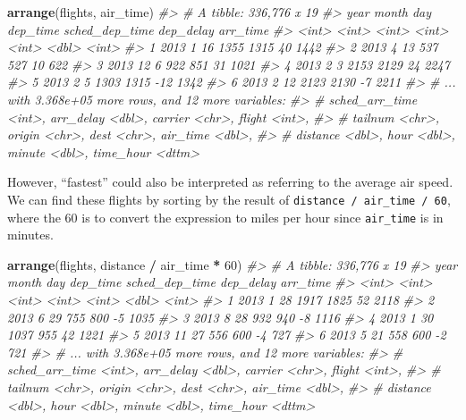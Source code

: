 \documentclass[]{book}
\newenvironment{Shaded}{\begin{snugshade}}{\end{snugshade}}
\newcommand{\CommentTok}[1]{\textcolor[rgb]{0.56,0.35,0.01}{\textit{#1}}}
\newcommand{\DecValTok}[1]{\textcolor[rgb]{0.00,0.00,0.81}{#1}}
\newcommand{\KeywordTok}[1]{\textcolor[rgb]{0.13,0.29,0.53}{\textbf{#1}}}
\newcommand{\NormalTok}[1]{#1}
\newcommand{\OperatorTok}[1]{\textcolor[rgb]{0.81,0.36,0.00}{\textbf{#1}}}
\newcommand{\StringTok}[1]{\textcolor[rgb]{0.31,0.60,0.02}{#1}}
\theoremstyle{plain}
\theoremstyle{remark}
\begin{document}
\begin{Shaded}
\begin{Highlighting}[]
\KeywordTok{arrange}\NormalTok{(flights, air_time) }
\CommentTok{#> # A tibble: 336,776 x 19}
\CommentTok{#>    year month   day dep_time sched_dep_time dep_delay arr_time}
\CommentTok{#>   <int> <int> <int>    <int>          <int>     <dbl>    <int>}
\CommentTok{#> 1  2013     1    16     1355           1315        40     1442}
\CommentTok{#> 2  2013     4    13      537            527        10      622}
\CommentTok{#> 3  2013    12     6      922            851        31     1021}
\CommentTok{#> 4  2013     2     3     2153           2129        24     2247}
\CommentTok{#> 5  2013     2     5     1303           1315       -12     1342}
\CommentTok{#> 6  2013     2    12     2123           2130        -7     2211}
\CommentTok{#> # ... with 3.368e+05 more rows, and 12 more variables:}
\CommentTok{#> #   sched_arr_time <int>, arr_delay <dbl>, carrier <chr>, flight <int>,}
\CommentTok{#> #   tailnum <chr>, origin <chr>, dest <chr>, air_time <dbl>,}
\CommentTok{#> #   distance <dbl>, hour <dbl>, minute <dbl>, time_hour <dttm>}
\end{Highlighting}
\end{Shaded}

However, ``fastest'' could also be interpreted as referring to the
average air speed. We can find these flights by sorting by the result of
\texttt{distance\ /\ air\_time\ /\ 60}, where the 60 is to convert the
expression to miles per hour since \texttt{air\_time} is in minutes.

\begin{Shaded}
\begin{Highlighting}[]
\KeywordTok{arrange}\NormalTok{(flights, distance }\OperatorTok{/}\StringTok{ }\NormalTok{air_time }\OperatorTok{*}\StringTok{ }\DecValTok{60}\NormalTok{)}
\CommentTok{#> # A tibble: 336,776 x 19}
\CommentTok{#>    year month   day dep_time sched_dep_time dep_delay arr_time}
\CommentTok{#>   <int> <int> <int>    <int>          <int>     <dbl>    <int>}
\CommentTok{#> 1  2013     1    28     1917           1825        52     2118}
\CommentTok{#> 2  2013     6    29      755            800        -5     1035}
\CommentTok{#> 3  2013     8    28      932            940        -8     1116}
\CommentTok{#> 4  2013     1    30     1037            955        42     1221}
\CommentTok{#> 5  2013    11    27      556            600        -4      727}
\CommentTok{#> 6  2013     5    21      558            600        -2      721}
\CommentTok{#> # ... with 3.368e+05 more rows, and 12 more variables:}
\CommentTok{#> #   sched_arr_time <int>, arr_delay <dbl>, carrier <chr>, flight <int>,}
\CommentTok{#> #   tailnum <chr>, origin <chr>, dest <chr>, air_time <dbl>,}
\CommentTok{#> #   distance <dbl>, hour <dbl>, minute <dbl>, time_hour <dttm>}
\end{Highlighting}
\end{Shaded}
\end{document}
